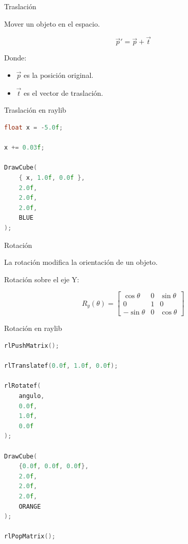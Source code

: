\documentclass{beamer}
\begin{document}
\begin{frame}{Traslación}

Mover un objeto en el espacio.

$$
\vec{p}'=\vec{p}+\vec{t}
$$

\vspace{0.5cm}

Donde:

\begin{itemize}
    \item $\vec{p}$ es la posición original.
    \item $\vec{t}$ es el vector de traslación.
\end{itemize}

\end{frame}

\begin{frame}[fragile]{Traslación en raylib}

\begin{lstlisting}[language=C++]
float x = -5.0f;

x += 0.03f;

DrawCube(
    { x, 1.0f, 0.0f },
    2.0f,
    2.0f,
    2.0f,
    BLUE
);
\end{lstlisting}

\end{frame}

\begin{frame}{Rotación}

La rotación modifica la orientación de un objeto.

\vspace{0.4cm}

Rotación sobre el eje Y:

$$
R_y(\theta)=
\begin{bmatrix}
\cos\theta & 0 & \sin\theta \\
0 & 1 & 0 \\
-\sin\theta & 0 & \cos\theta
\end{bmatrix}
$$

\end{frame}

\begin{frame}[fragile]{Rotación en raylib}

\begin{lstlisting}[language=C++]
rlPushMatrix();

rlTranslatef(0.0f, 1.0f, 0.0f);

rlRotatef(
    angulo,
    0.0f,
    1.0f,
    0.0f
);

DrawCube(
    {0.0f, 0.0f, 0.0f},
    2.0f,
    2.0f,
    2.0f,
    ORANGE
);

rlPopMatrix();
\end{lstlisting}

\end{frame}
\end{document}
